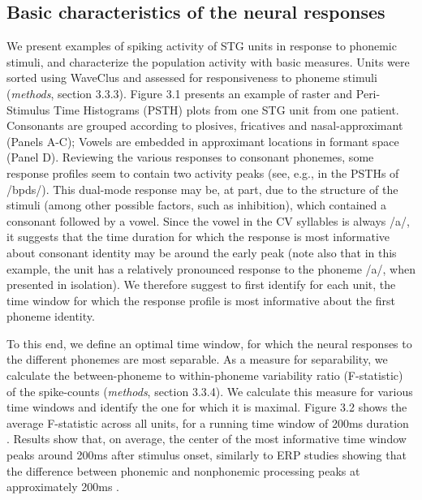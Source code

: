 \subsection{Basic characteristics of the neural responses}
We present examples of spiking activity of STG units in response to phonemic stimuli, and characterize the population activity with basic measures. Units were sorted using WaveClus and assessed for responsiveness to phoneme stimuli (\textit{methods}, section 3.3.3). Figure 3.1 presents an example of raster and Peri-Stimulus Time Histograms (PSTH) plots from one STG unit from one patient. Consonants are grouped according to plosives, fricatives and nasal-approximant (Panels A-C); Vowels are embedded in approximant locations in formant space (Panel D). Reviewing the various responses to consonant phonemes, some response profiles seem to contain two activity peaks (see, e.g., in the PSTHs of /bpds/). This dual-mode response may be, at part, due to the structure of the stimuli (among other possible factors, such as inhibition), which contained a consonant followed by a vowel. Since the vowel in the CV syllables is always /a/, it suggests that the time duration for which the response is most informative about consonant identity may be around the early peak (note also that in this example, the unit has a relatively pronounced  response  to the phoneme /a/, when presented in isolation). We therefore suggest to first identify for each unit, the time window for which the response profile is most informative about the first phoneme identity.

To this end, we define an optimal time window, for which the neural responses to the different phonemes are most separable. As a measure for separability, we calculate the between-phoneme to within-phoneme variability ratio (F-statistic) of the spike-counts (\textit{methods}, section 3.3.4). We calculate this measure for various time windows and identify the one for which it is maximal. Figure 3.2 shows the average F-statistic across all units, for a running time window of 200ms duration \citep{chan2013speech}. Results show that, on average, the center of the most informative time window peaks around 200ms after stimulus onset, similarly to ERP studies showing that the difference between phonemic and nonphonemic processing peaks at approximately 200ms \citep{liebenthal2010specialization}.

